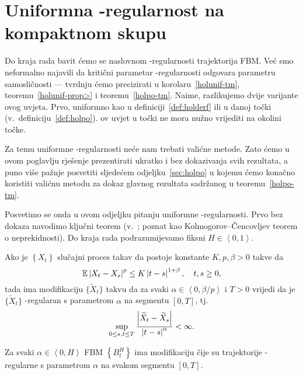 \documentclass[main.tex]{subfiles}
\begin{document}
\nocite{*}

\section{Uniformna \holder -regularnost na kompaktnom skupu}\label{sec:holunif}
Do kraja rada bavit ćemo se naslovnom \holder -regularnosti
trajektorija FBM. Već smo neformalno najavili da kritični parametar \holder -regularnosti
odgovara parametru samosličnosti --- tvrdnju ćemo precizirati u
korolaru~\ref{holunif-tm}, teoremu~\ref{holunif-prop>} i teoremu~\ref{holpo-tm}. Naime,
razlikujemo dvije varijante \holder ovog uvjeta. Prvo, uniformno
kao u definiciji~\ref{def:holderf} ili u danoj točki
(v.\ definiciju~\ref{def:holpo}). \holder ov uvjet u točki ne mora nužno
vrijediti na okolini točke.

Za temu uniformne \holder -regularnosti neće nam trebati
valićne metode. Zato ćemo u ovom poglavlju rješenje prezentirati
ukratko i bez dokazivanja svih rezultata, a puno više pažnje
posvetiti sljedećem odjeljku~\ref{sec:holpo} u kojemu
ćemo konačno koristiti valićnu metodu za dokaz glavnog rezultata sadržanog
u teoremu~\ref{holpo-tm}.

Posvetimo se onda u ovom odjeljku pitanju uniformne \holder -regularnosti.
Prvo bez dokaza navodimo ključni teorem (v.~\cite[tm.~3.1]{se}; poznat kao Kolmogorov--Čencovljev teorem o neprekidnosti). Do kraja
rada podrazumijevamo fiksni \( H \in \left\langle 0,1 \right\rangle \).

\begin{teorem}\label{holunif-setm}
	Ako je \( \left\{ X_t \right\} \) slučajni proces takav da
	postoje konstante \( K, p, \beta > 0 \) takve da
	\begin{equation}
		\mathbb{E} \left| {X_t-X_s} \right|^p \le K \left| {t-s} \right|^{1+\beta}, \quad t,s \ge 0,
	\end{equation}
	tada ima modifikaciju \( \bigl\{ \widetilde X_t \bigr\} \)
	takvu da za svaki \( \alpha \in \left\langle 0, \beta/p \right\rangle \)
	i \( T > 0 \) vrijedi da je \( \bigl\{ \widetilde X_t \bigr\} \)
	\holder-regularan s parametrom \( \alpha \) na segmentu \( \left[ 0,T \right] \), tj.\
	\begin{equation}\label{eq:kolmcen}
		\sup\limits_{0 \le s, t \le T}
		\frac{\left| {\widetilde X_t-\widetilde X_s} \right|}{\left| {t-s} \right|^\alpha} < \infty.
	\end{equation}
\end{teorem}

\begin{korolar}\label{holunif-tm}
	Za svaki \( \alpha \in \left\langle0,H\right\rangle  \) FBM \( \left\{ B^H_t \right\} \) ima modifikaciju
	čije su trajektorije \holder -regularne s parametrom \( \alpha \) na svakom segmentu
	\( \left[ 0,T \right] \).
\end{korolar}
\end{document}
